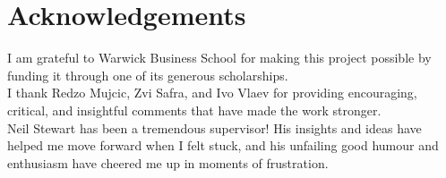 
\chapter*{Acknowledgements}%
\label{cha:acknowledgements}

I am grateful to Warwick Business School for making this project possible by funding it through one of its generous scholarships.\\

\noindent I thank Redzo Mujcic, Zvi Safra, and Ivo Vlaev for providing encouraging, critical, and insightful comments that have made the work stronger.\\

\noindent Neil Stewart has been a tremendous supervisor! His insights and ideas have
helped me move forward when I felt stuck, and his unfailing good humour and
enthusiasm have cheered me up in moments of frustration.
